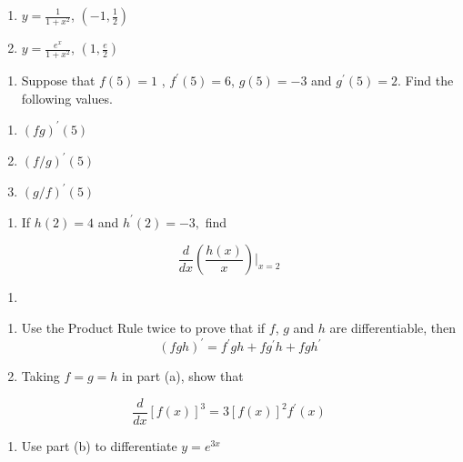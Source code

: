 \documentclass[]{book}
\providecommand{\tightlist}{%
  \setlength{\itemsep}{0pt}\setlength{\parskip}{0pt}}
\begin{document}
\begin{enumerate}
\def\labelenumi{(\alph{enumi})}
\tightlist
\item
  \(y= \frac{1}{1+x^2}\), \((-1, \frac{1}{2})\)
\item
  \(y= \frac{e^x }{1+x^2}\), \((1, \frac{e}{2})\)
\end{enumerate}

\begin{enumerate}
\def\labelenumi{\arabic{enumi}.}
\setcounter{enumi}{9}
\tightlist
\item
  Suppose that \(f(5) = 1\) , \(f^\prime (5) =6\), \(g(5) = -3\) and \(g^\prime (5) =2\). Find the following values.
\end{enumerate}

\begin{enumerate}
\def\labelenumi{(\alph{enumi})}
\tightlist
\item
  \((fg)^\prime(5)\)
\item
  \((f/g)^\prime(5)\)
\item
  \((g/f)^\prime(5)\)
\end{enumerate}

\begin{enumerate}
\def\labelenumi{\arabic{enumi}.}
\setcounter{enumi}{10}
\tightlist
\item
  If \(h(2) = 4\) and \(h^\prime(2) = -3,\) find
\end{enumerate}

\[\frac{d}{dx} \left( \frac{h(x)}{x} \right) \Bigr|_{x=2} \]

\begin{enumerate}
\def\labelenumi{\arabic{enumi}.}
\setcounter{enumi}{11}
\item
\end{enumerate}

\begin{enumerate}
\def\labelenumi{(\alph{enumi})}
\item
  Use the Product Rule twice to prove that if \(f\), \(g\) and \(h\) are differentiable, then
  \[(fgh)^\prime = f^\prime gh+ fg^\prime h + fgh^\prime\]
\item
  Taking \(f=g=h\) in part (a), show that
\end{enumerate}

\[\frac{d}{dx} [f(x)]^3= 3[f(x)]^2f^\prime(x)\]

\begin{enumerate}
\def\labelenumi{(\alph{enumi})}
\setcounter{enumi}{2}
\tightlist
\item
  Use part (b) to differentiate \(y= e^{3x}\)
\end{enumerate}
\end{document}
